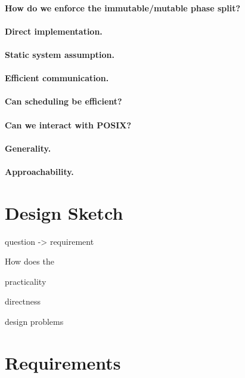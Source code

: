\paragraph{How do we enforce the immutable/mutable phase split?}

\paragraph{Direct implementation.}

\paragraph{Static system assumption.}

\paragraph{Efficient communication.}

\paragraph{Can scheduling be efficient?}

\paragraph{Can we interact with POSIX?}

\paragraph{Generality.}

\paragraph{Approachability.}





\section{Design Sketch}

question -> requirement

How does the

practicality

directness

design problems




\section{Requirements}

